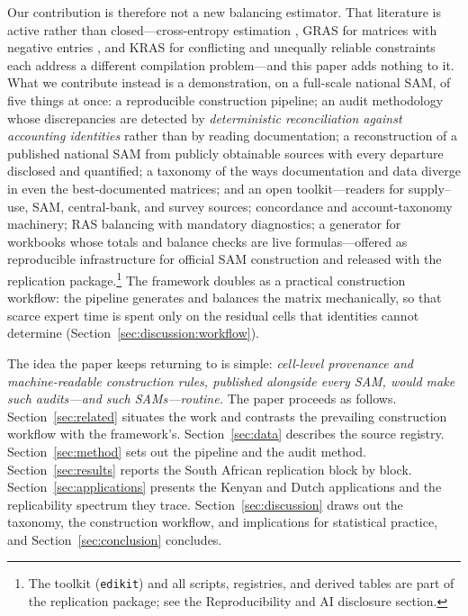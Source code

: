 Our contribution is therefore not a new balancing estimator. That
literature is active rather than closed---cross-entropy estimation
\citep{robinson2001}, GRAS for matrices with negative entries
\citep{junius2003,temurshoev2013}, and KRAS for conflicting and
unequally reliable constraints \citep{lenzen2009} each address a
different compilation problem---and this paper adds nothing to it. What
we contribute instead is a demonstration, on a full-scale
national SAM, of five things at once: a reproducible construction pipeline;
an audit methodology whose discrepancies are detected by
\emph{deterministic reconciliation against accounting identities} rather
than by reading documentation; a reconstruction of a published national SAM
from publicly obtainable sources with every departure disclosed and
quantified; a
taxonomy of the ways documentation and data diverge in even the
best-documented matrices; and an open toolkit---readers for supply--use,
SAM, central-bank, and survey sources; concordance and account-taxonomy
machinery; RAS balancing with mandatory diagnostics; a generator for
workbooks whose totals and balance checks are live formulas---offered as
reproducible infrastructure for official SAM construction and released
with the replication package.\footnote{The toolkit (\texttt{edikit}) and
all scripts, registries, and derived tables are part of the replication
package; see the Reproducibility and AI disclosure section.} The framework
doubles as a practical construction workflow: the pipeline generates and
balances the matrix mechanically, so that scarce expert time is spent only
on the residual cells that identities cannot determine
(Section~\ref{sec:discussion:workflow}).

The idea the paper keeps returning to is simple: \emph{cell-level
provenance and machine-readable construction rules, published alongside
every SAM, would make such audits---and such SAMs---routine.} The paper
proceeds as follows. Section~\ref{sec:related} situates the work and
contrasts the prevailing construction workflow with the framework's.
Section~\ref{sec:data} describes the source registry.
Section~\ref{sec:method} sets out the pipeline and the audit method.
Section~\ref{sec:results} reports the South African replication block by
block. Section~\ref{sec:applications} presents the Kenyan and Dutch
applications and the replicability spectrum they trace.
Section~\ref{sec:discussion} draws out the taxonomy, the construction
workflow, and implications for statistical practice, and
Section~\ref{sec:conclusion} concludes.
